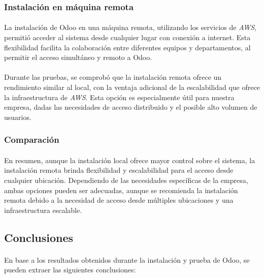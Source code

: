 \subsubsection{Instalación en máquina remota}
\paragraph{}
La instalación de Odoo en una máquina remota, utilizando los servicios de \textit{AWS}, permitió acceder al sistema desde cualquier lugar con conexión a internet. Esta flexibilidad facilita la colaboración entre diferentes equipos y departamentos, al permitir el acceso simultáneo y remoto a Odoo.
\paragraph{}
Durante las pruebas, se comprobó que la instalación remota ofrece un rendimiento similar al local, con la ventaja adicional de la escalabilidad que ofrece la infraestructura de \textit{AWS}. Esta opción es especialmente útil para nuestra empresa, dadas las necesidades de acceso distribuido y el posible alto volumen de usuarios.

\subsubsection{Comparación}
\paragraph{}
En resumen, aunque la instalación local ofrece mayor control sobre el sistema, la instalación remota brinda flexibilidad y escalabilidad para el acceso desde cualquier ubicación. Dependiendo de las necesidades específicas de la empresa, ambas opciones pueden ser adecuadas, aunque se recomienda la instalación remota debido a la necesidad de acceso desde múltiples ubicaciones y una infraestructura escalable.

\subsection{Conclusiones}
\paragraph{}
En base a los resultados obtenidos durante la instalación y prueba de Odoo, se pueden extraer las siguientes conclusiones:


